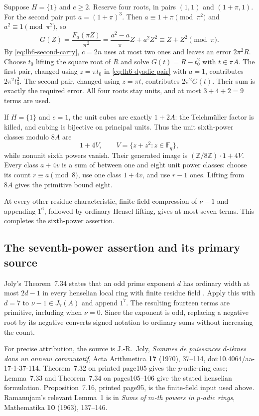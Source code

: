 \documentclass[11pt,reqno]{amsart}
\numberwithin{equation}{section}
\theoremstyle{definition}
\begin{document}
Suppose $H=\{1\}$ and $e\ge2$. Reserve four roots, in pairs
$(1,1)$ and $(1+\pi,1)$. For the second pair put $a=(1+\pi)^3$.
Then $a\equiv1+\pi\pmod{\pi^2}$ and $a^2\equiv1\pmod{\pi^2}$,
so
\[
 G(Z)=\frac{F_a(\pi Z)}{\pi^2}
     =\frac{a^2-a}{\pi}Z+a^2Z^2\equiv Z+Z^2\pmod\pi.
\]
By \eqref{eq:lh6-second-carry}, $c=2n$ uses at most two ones
and leaves an error $2\pi^2R$. Choose $t_0$ lifting the square root
of $\bar R$ and solve $G(t)=R-t_0^2$ with $t\in\pi A$.
The first pair, changed using $z=\pi t_0$ in
\eqref{eq:lh6-dyadic-pair} with $a=1$, contributes
$2\pi^2t_0^2$. The second pair, changed using $z=\pi t$,
contributes $2\pi^2G(t)$. Their sum is exactly the required error.
All four roots stay units, and at most $3+4+2=9$ terms are used.

If $H=\{1\}$ and $e=1$, the unit cubes are exactly $1+2A$:
the Teichm\"uller factor is killed, and cubing is bijective on
principal units. Thus the unit sixth-power classes modulo $8A$ are
\[
 1+4V,\qquad V=\{z+z^2:z\in\mathbb F_q\},
\]
while nonunit sixth powers vanish. Their generated image is
$(\mathbb Z/8\mathbb Z)\cdot1+4V$. Every class $a+4v$ is a
sum of between one and eight unit power classes: choose its count
$r\equiv a\pmod8$, use one class $1+4v$, and use $r-1$ ones.
Lifting from $8A$ gives the primitive bound eight.

At every other residue characteristic, finite-field compression of
$\nu-1$ and appending $1^6$, followed by ordinary Hensel lifting,
gives at most seven terms. This completes the sixth-power assertion.

\subsection{The seventh-power assertion and its primary source}

Joly's Theorem~7.34 states that an odd prime exponent $d$ has ordinary
width at most $2d-1$ in every henselian local ring with finite residue
field \cite[Theorem~7.34, pp.~105--106]{Joly1970}. Apply this with
$d=7$ to $\nu-1\in J_7(A)$ and append $1^7$. The resulting fourteen
terms are primitive, including when $\nu=0$. Since the exponent is
odd, replacing a negative root by its negative converts signed
notation to ordinary sums without increasing the count.

For precise attribution, the source is J.-R.~Joly,
\emph{Sommes de puissances $d$-i\`emes dans un anneau commutatif},
Acta Arithmetica \textbf{17} (1970), 37--114,
doi:10.4064/aa-17-1-37-114. Theorem~7.32 on printed page105 gives
the $p$-adic-ring case; Lemma~7.33 and Theorem~7.34 on pages105--106
give the stated henselian formulation. Proposition~7.16, printed
page95, is the finite-field input used above. Ramanujam's relevant
Lemma~1 is in \emph{Sums of $m$-th powers in $p$-adic rings},
Mathematika \textbf{10} (1963), 137--146.
\end{document}
